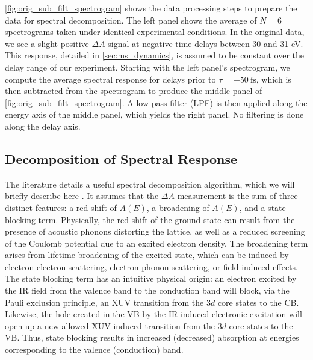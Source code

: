 \cref{fig:orig_sub_filt_spectrogram} shows the data processing steps to prepare the data for spectral decomposition. The left panel shows the average of $N=6$ spectrograms taken under identical experimental conditions. In the original data, we see a slight positive $\Delta A$ signal at negative time delays between 30 and 31 eV. This response, detailed in \cref{sec:ms_dynamics}, is assumed to be constant over the delay range of our experiment. Starting with the left panel's spectrogram, we compute the average spectral response for delays prior to $\tau = -50 \ \textrm{fs}$, which is then subtracted from the spectrogram to produce the middle panel of \cref{fig:orig_sub_filt_spectrogram}. A low pass filter (LPF) is then applied along the energy axis of the middle panel, which yields the right panel. No filtering is done along the delay axis.

\subsection{Decomposition of Spectral Response}
\label{sec:spectral_decomposition}

The literature details a useful spectral decomposition algorithm, which we will briefly describe here \cite{zurchDirectSimultaneousObservation2017}. It assumes that the $\Delta A$ measurement is the sum of three distinct features: a red shift of $A(E)$, a broadening of $A(E)$, and a state-blocking term. Physically, the red shift of the ground state can result from the presence of acoustic phonons distorting the lattice, as well as a reduced screening of the Coulomb potential due to an excited electron density. The broadening term arises from lifetime broadening of the excited state, which can be induced by electron-electron scattering, electron-phonon scattering, or field-induced effects. The state blocking term has an intuitive physical origin: an electron excited by the IR field from the valence band to the conduction band will block, via the Pauli exclusion principle, an XUV transition from the $3d$ core states to the CB. Likewise, the hole created in the VB by the IR-induced electronic excitation will open up a new allowed XUV-induced transition from the $3d$ core states to the VB. Thus, state blocking results in increased (decreased) absorption at energies corresponding to the valence (conduction) band.

